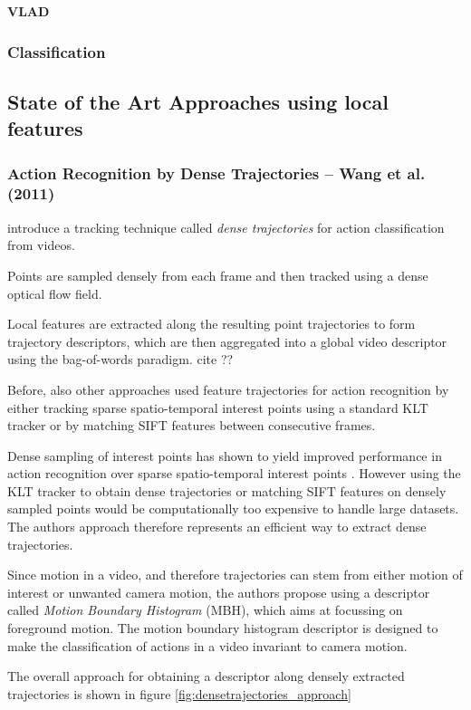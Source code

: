 \textbf{VLAD}

\subsubsection{Classification}

\subsection{State of the Art Approaches using local features}

\subsubsection{Action Recognition by Dense Trajectories -- Wang et al. (2011)}

\textcite{wang_action_2011} introduce a tracking technique called \textit{dense trajectories} for action classification from videos.

Points are sampled densely from each frame and then tracked using a dense optical flow field.

Local features are extracted along the resulting point trajectories to form trajectory descriptors, which are then aggregated into a global video descriptor using the bag-of-words paradigm. cite ??

Before, also other approaches used feature trajectories for action recognition by either tracking sparse spatio-temporal interest points using a standard KLT tracker or by matching SIFT features between consecutive frames.

Dense sampling of interest points has shown to yield improved performance in action recognition over sparse spatio-temporal interest points \cite{wang_evaluation_2009}.
However using the KLT tracker to obtain dense trajectories or matching SIFT features on densely sampled points would be computationally too expensive to handle large datasets. 
The authors approach therefore represents an efficient way to extract dense trajectories.

Since motion in a video, and therefore trajectories can stem from either motion of interest or unwanted camera motion, the authors propose using a descriptor called \textit{Motion Boundary Histogram} (MBH), which aims at focussing on foreground motion.
The motion boundary histogram descriptor is designed to make the classification of actions in a video invariant to camera motion.

The overall approach for obtaining a descriptor along densely extracted trajectories is shown in figure \ref{fig:densetrajectories_approach}

